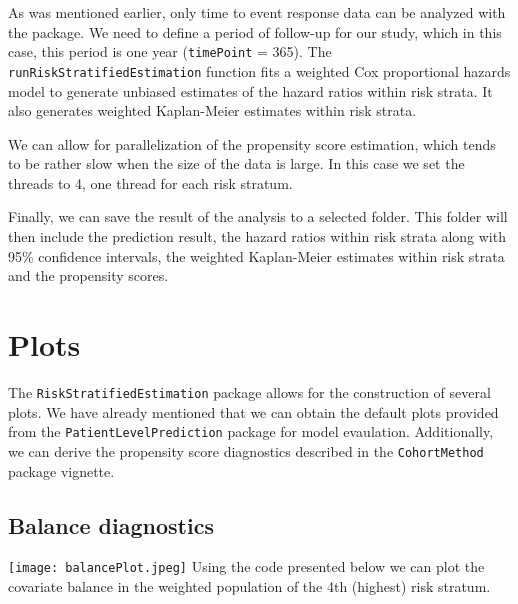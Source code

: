 \documentclass[]{article}
\newenvironment{Shaded}{\begin{snugshade}}{\end{snugshade}}
\newcommand{\DataTypeTok}[1]{\textcolor[rgb]{0.13,0.29,0.53}{#1}}
\newcommand{\DecValTok}[1]{\textcolor[rgb]{0.00,0.00,0.81}{#1}}
\newcommand{\KeywordTok}[1]{\textcolor[rgb]{0.13,0.29,0.53}{\textbf{#1}}}
\newcommand{\NormalTok}[1]{#1}
\newcommand{\OperatorTok}[1]{\textcolor[rgb]{0.81,0.36,0.00}{\textbf{#1}}}
\newcommand{\OtherTok}[1]{\textcolor[rgb]{0.56,0.35,0.01}{#1}}
\begin{document}
As was mentioned earlier, only time to event response data can be
analyzed with the package. We need to define a period of follow-up for
our study, which in this case, this period is one year
(\texttt{timePoint} = 365). The \texttt{runRiskStratifiedEstimation}
function fits a weighted Cox proportional hazards model to generate
unbiased estimates of the hazard ratios within risk strata. It also
generates weighted Kaplan-Meier estimates within risk strata.

We can allow for parallelization of the propensity score estimation,
which tends to be rather slow when the size of the data is large. In
this case we set the threads to 4, one thread for each risk stratum.

Finally, we can save the result of the analysis to a selected folder.
This folder will then include the prediction result, the hazard ratios
within risk strata along with 95\% confidence intervals, the weighted
Kaplan-Meier estimates within risk strata and the propensity scores.

\hypertarget{plots}{%
\section{Plots}\label{plots}}

The \texttt{RiskStratifiedEstimation} package allows for the
construction of several plots. We have already mentioned that we can
obtain the default plots provided from the
\texttt{PatientLevelPrediction} package for model evaulation.
Additionally, we can derive the propensity score diagnostics described
in the \texttt{CohortMethod} package vignette.

\hypertarget{balance-diagnostics}{%
\subsection{Balance diagnostics}\label{balance-diagnostics}}

\texttt{[image: balancePlot.jpeg]} Using the code presented below we can
plot the covariate balance in the weighted population of the 4th
(highest) risk stratum.

\begin{Shaded}
\end{Shaded}
\end{document}
